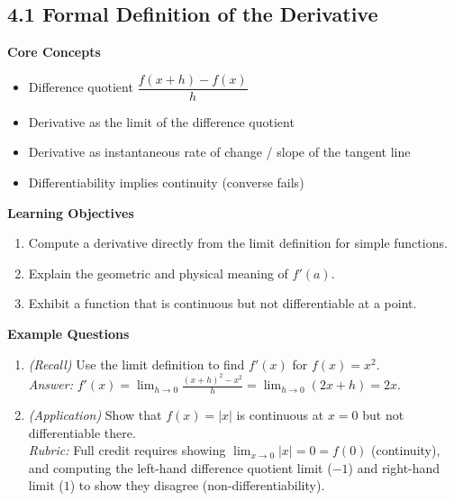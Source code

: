 \documentclass[11pt]{article}
\begin{document}
\subsection{4.1 Formal Definition of the Derivative}
\textbf{Core Concepts}
\begin{itemize}
\item Difference quotient $\dfrac{f(x+h)-f(x)}{h}$
\item Derivative as the limit of the difference quotient
\item Derivative as instantaneous rate of change / slope of the tangent line
\item Differentiability implies continuity (converse fails)
\end{itemize}
\textbf{Learning Objectives}
\begin{enumerate}
\item Compute a derivative directly from the limit definition for simple functions.
\item Explain the geometric and physical meaning of $f'(a)$.
\item Exhibit a function that is continuous but not differentiable at a point.
\end{enumerate}
\textbf{Example Questions}
\begin{enumerate}
\item \emph{(Recall)} Use the limit definition to find $f'(x)$ for $f(x) = x^2$. \\
\textit{Answer:} $f'(x) = \displaystyle\lim_{h\to 0}\frac{(x+h)^2-x^2}{h} = \lim_{h\to0}(2x+h) = 2x$.
\item \emph{(Application)} Show that $f(x)=|x|$ is continuous at $x=0$ but not differentiable there. \\
\textit{Rubric:} Full credit requires showing $\lim_{x\to0}|x|=0=f(0)$ (continuity), and computing the left-hand difference quotient limit ($-1$) and right-hand limit ($1$) to show they disagree (non-differentiability).
\end{enumerate}
\end{document}
